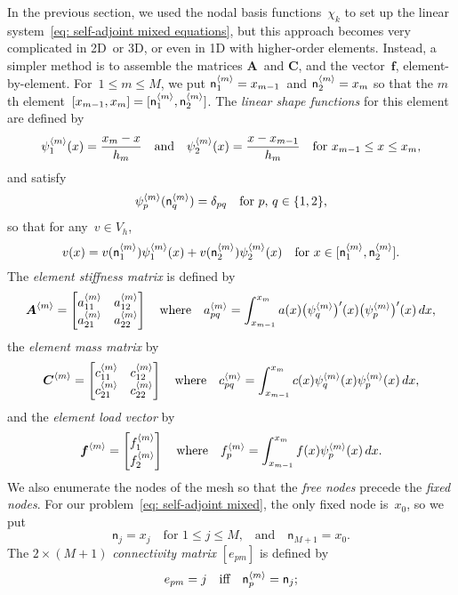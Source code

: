In the previous section, we used the nodal basis functions~$\chi_k$ to set up 
the linear system~\eqref{eq: self-adjoint mixed equations}, but this approach 
becomes very complicated in 2D~or 3D, or even in 1D with higher-order elements.
Instead, a simpler method is to assemble the matrices $\boldsymbol{A}$~and 
$\boldsymbol{C}$, and the vector~$\boldsymbol{f}$, element-by-element.  
For~$1\le m\le M$, we put $\mathsf{n}^{\langle m\rangle}_1=x_{m-1}$~and
$\mathsf{n}^{\langle m\rangle}_2=x_m$ so that the $m$th 
element~$[x_{m-1},x_m]=[\mathsf{n}^{\langle m\rangle}_1,\mathsf{n}^{\langle m\rangle}_2]$.  The
\emph{linear shape functions} for this element are defined by
\[
\psi^{\langle m\rangle}_1(x)=\frac{x_m-x}{h_m}
\quad\text{and}\quad
\psi^{\langle m\rangle}_2(x)=\frac{x-x_{m-1}}{h_m}
\quad\text{for $x_{m-1}\le x\le x_m$,}
\]
and satisfy
\[
\psi^{\langle m\rangle}_p(\mathsf{n}^{\langle m\rangle}_q)=\delta_{pq}
    \quad\text{for $p$, $q\in\{1,2\}$,}
\]
so that for any~$v\in V_h$,
\[
v(x)=v(\mathsf{n}^{\langle m\rangle}_1)\psi^{\langle m\rangle}_1(x)
    +v(\mathsf{n}^{\langle m\rangle}_2)\psi^{\langle m\rangle}_2(x)
    \quad\text{for $x\in[\mathsf{n}^{\langle m\rangle}_1,\mathsf{n}^{\langle m\rangle}_2]$.}
\]
The \emph{element stiffness matrix} is defined by
\[
\boldsymbol{A}^{\langle m\rangle}=\begin{bmatrix}
a^{\langle m\rangle}_{11}&a^{\langle m\rangle}_{12}\\
a^{\langle m\rangle}_{21}&a^{\langle m\rangle}_{22}\end{bmatrix}
\quad\text{where}\quad
a^{\langle m\rangle}_{pq}=\int_{x_{m-1}}^{x_m}a(x)\bigl(\psi_q^{\langle m\rangle}\bigr)'(x)
    \bigl(\psi_p^{\langle m\rangle}\bigr)'(x)\,dx,
\]
the \emph{element mass matrix} by
\[
\boldsymbol{C}^{\langle m\rangle}=\begin{bmatrix}
c^{\langle m\rangle}_{11}&c^{\langle m\rangle}_{12}\\
c^{\langle m\rangle}_{21}&c^{\langle m\rangle}_{22}\end{bmatrix}
\quad\text{where}\quad
c^{\langle m\rangle}_{pq}=\int_{x_{m-1}}^{x_m}c(x)\psi_q^{\langle m\rangle}(x) 
    \psi_p^{\langle m\rangle}(x)\,dx,
\]
and the \emph{element load vector} by
\[
\boldsymbol{f}^{\langle m\rangle}=\begin{bmatrix}f^{\langle m\rangle}_1\\ f^{\langle m\rangle}_2\end{bmatrix}
\quad\text{where}\quad
f^{\langle m\rangle}_p=\int_{x_{m-1}}^{x_m}f(x)\psi_p^{\langle m\rangle}(x)\,dx.
\]
We also enumerate the nodes of the mesh so that the \emph{free nodes} precede 
the \emph{fixed nodes}.  For our problem~\eqref{eq: self-adjoint mixed}, the 
only fixed node is~$x_0$, so we put
\[
\mathsf{n}_j=x_j\quad\text{for $1\le j\le M$,}
\quad\text{and}\quad\mathsf{n}_{M+1}=x_0.
\]
The $2\times(M+1)$ \emph{connectivity matrix} $[e_{pm}]$ is defined by
\begin{equation}\label{eq: e pm def}
e_{pm}=j\quad\text{iff}\quad\mathsf{n}^{\langle m\rangle}_p=\mathsf{n}_j;
\end{equation}
